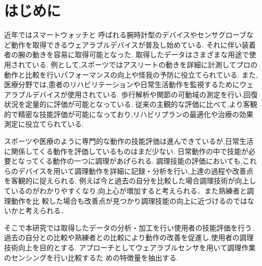 \section{はじめに}
近年ではスマートウォッチと
呼ばれる腕時計型のデバイスやセンサグローブなど動作を取得できるウェアラブルデバイスが普及し始めている.
それに伴い装着者の腕の動きを容易に取得可能となった.
取得したデータはさまざまな用途で使用されている.
例として,スポーツではアスリートの動きを詳細に計測してプロの動作と比較を行いパフォーマンスの向上や怪我の予防に役立てられている.
また,医療分野では,患者のリハビリテーションや日常生活動作を監視するためにウェアラブルデバイスが使用されている.
歩行解析や関節の可動域の測定を行い,回復状況を定量的に評価が可能となっている.
従来の主観的な評価に比べて,より客観的で精密な技能評価が可能になっており,リハビリプランの最適化や治療の効果測定に役立てられている.

スポーツや医療のように専門的な動作の技能評価は進んできているが,日常生活に関係してくる動作を評価しているものはまだ少ない.
日常動作の中で技能が必要となってくる動作の一つに調理があげられる.
調理技能の評価においても,これらのデバイスを用いて調理動作を詳細に記録・分析を行い,上達の過程や改善点を客観的に捉えられる.
例えば今と過去の自分を比較した場合調理技術が向上しているのがわかりやすくなり,向上心が増加すると考えられる．また熟練者と調理動作を比
較した場合も改善点が見つかり調理技能の向上に近づけるのではないかと考えられる．

そこで本研究では取得したデータの分析・加工を行い使用者の技能評価を行う.
過去の自分との比較や熟練者との比較により動作の改善を促進し,使用者の調理技術向上を目的とする.
アプローチとしてウェアラブルセンサを用いて調理作業のセンシングを行い比較するた
めの特徴量を抽出する.